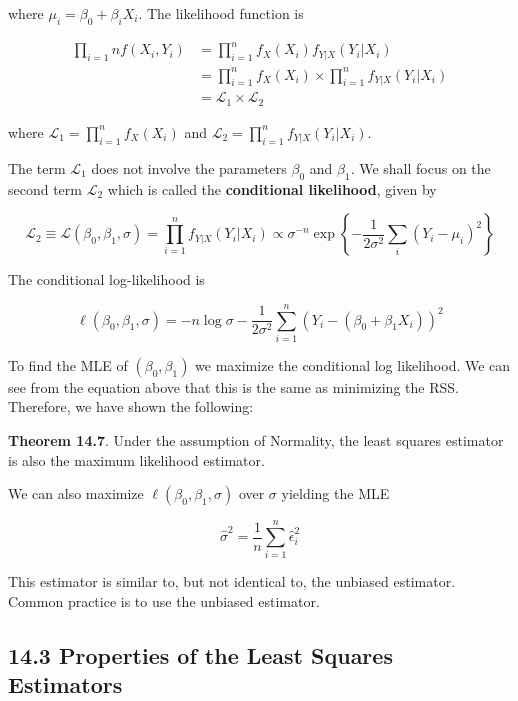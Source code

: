 where \(\mu_{i} = \beta_{0} + \beta_{i} X_{i}\). The likelihood function is

\begin{align*}
\prod_{i=1}n f(X_{i}, Y_{i}) &= \prod_{i=1}^{n} f_X(X_{i}) f_{Y|X}(Y_{i} | X_{i})\\
&= \prod_{i=1}^{n} f_X(X_{i}) \times \prod_{i=1}^{n} f_{Y|X}(Y_{i} | X_{i}) \\
&= \mathcal{L}_{1} \times \mathcal{L}_{2}
\end{align*}

where \(\mathcal{L}_{1} = \prod_{i=1}^{n} f_X(X_{i})\) and
\(\mathcal{L}_{2} = \prod_{i=1}^{n} f_{Y|X}(Y_{i} | X_{i})\).

The term \(\mathcal{L}_{1}\) does not involve the parameters \(\beta_{0}\)
and \(\beta_{1}\). We shall focus on the second term \(\mathcal{L}_{2}\)
which is called the \textbf{conditional likelihood}, given by

\[\mathcal{L}_{2} \equiv \mathcal{L}(\beta_{0}, \beta_{1}, \sigma)
= \prod_{i=1}^{n} f_{Y|X}(Y_{i} | X_{i})
\propto \sigma^{-n} \exp \left\{ - \frac{1}{2 \sigma^{2}} \sum_{i} (Y_{i} - \mu_{i})^{2} \right\}
\]

The conditional log-likelihood is

\[\ell(\beta_{0}, \beta_{1}, \sigma) = -n \log \sigma - \frac{1}{2 \sigma^{2}} \sum_{i=1}^{n} \left(Y_{i} - (\beta_{0} + \beta_{1} X_{i}) \right)^{2}\]

To find the MLE of \((\beta_{0}, \beta_{1})\) we maximize the conditional
log likelihood. We can see from the equation above that this is the same
as minimizing the RSS. Therefore, we have shown the following:

\textbf{Theorem 14.7}. Under the assumption of Normality, the least
squares estimator is also the maximum likelihood estimator.

We can also maximize \(\ell(\beta_{0}, \beta_{1}, \sigma)\) over \(\sigma\)
yielding the MLE

\[ \hat{\sigma}^{2} = \frac{1}{n} \sum_{i=1}^{n} \hat{\epsilon}_{i}^{2} \]

This estimator is similar to, but not identical to, the unbiased
estimator. Common practice is to use the unbiased estimator.

\subsection*{14.3 Properties of the Least Squares
Estimators}\label{properties-of-the-least-squares-estimators}

